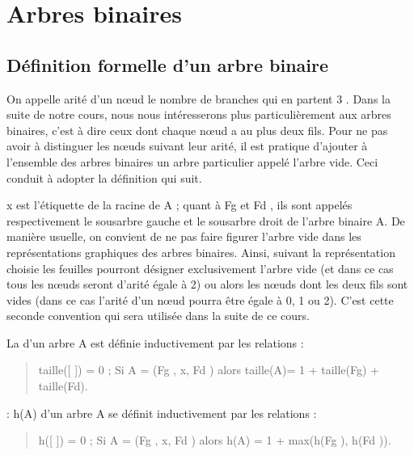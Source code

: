 \documentclass[letterpaper,10pt,english]{jupyterBook}
\begin{document}
\chapter{Arbres binaires}
\label{\detokenize{notebooks/Arbres-binaires/Arbres:arbres-binaires}}\label{\detokenize{notebooks/Arbres-binaires/Arbres::doc}}

\section{Définition formelle d’un arbre binaire}
\label{\detokenize{notebooks/Arbres-binaires/Arbres:definition-formelle-dun-arbre-binaire}}
\sphinxAtStartPar
On appelle arité d’un nœud le nombre de branches qui en partent 3 . Dans la suite de notre cours, nous nous intéresserons plus particulièrement aux arbres binaires, c’est à dire ceux dont chaque nœud a au plus deux fils.
Pour ne pas avoir à distinguer les nœuds suivant leur arité, il est pratique d’ajouter à l’ensemble des arbres binaires un arbre particulier appelé l’arbre vide. Ceci conduit à adopter la définition qui suit.



\sphinxAtStartPar
x est l’étiquette de la racine de A ; quant à Fg et Fd , ils sont appelés respectivement le sous\sphinxhyphen{}arbre gauche et le sous\sphinxhyphen{}arbre droit de l’arbre binaire A.
De manière usuelle, on convient de ne pas faire figurer l’arbre vide dans les représentations graphiques des arbres binaires. Ainsi, suivant la représentation choisie les feuilles pourront désigner exclusivement l’arbre vide (et dans ce cas tous les nœuds seront d’arité égale à 2) ou alors les nœuds dont les deux fils sont vides (dans ce cas l’arité d’un nœud pourra être égale à 0, 1 ou 2). C’est cette seconde convention qui sera utilisée dans la suite de ce cours.

\sphinxAtStartPar
{} La  d’un arbre A est définie inductivement par les relations :
\begin{quote}

\sphinxAtStartPar
taille({[}  {]}) = 0 ;
Si A = (Fg , x, Fd ) alors taille(A)= 1 + taille(Fg) + taille(Fd).
\end{quote}

\sphinxAtStartPar
{} : h(A) d’un arbre A se définit inductivement par les relations :
\begin{quote}

\sphinxAtStartPar
h({[} {]}) = 0 ;
Si A = (Fg , x, Fd ) alors h(A) = 1 + max(h(Fg ), h(Fd )).
\end{quote}
\end{document}
